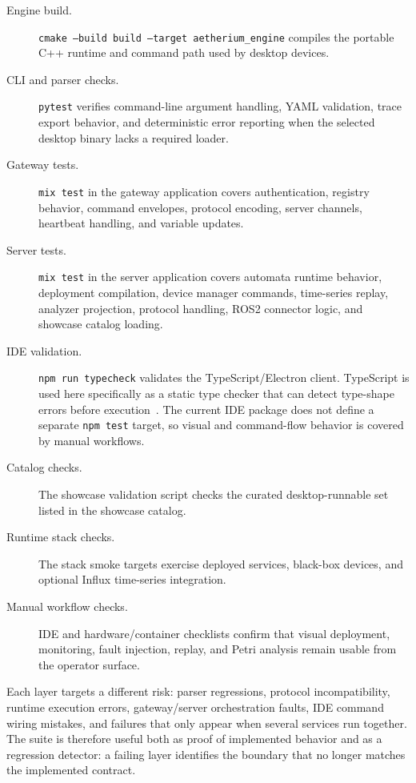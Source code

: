 \begin{description}
  \item[Engine build.] \texttt{cmake --build build --target aetherium\_engine} compiles the portable C++ runtime and command path used by desktop devices.
  \item[CLI and parser checks.] \texttt{pytest} verifies command-line argument handling, YAML validation, trace export behavior, and deterministic error reporting when the selected desktop binary lacks a required loader.
  \item[Gateway tests.] \texttt{mix test} in the gateway application covers authentication, registry behavior, command envelopes, protocol encoding, server channels, heartbeat handling, and variable updates.
  \item[Server tests.] \texttt{mix test} in the server application covers automata runtime behavior, deployment compilation, device manager commands, time-series replay, analyzer projection, protocol handling, ROS2 connector logic, and showcase catalog loading.
  \item[IDE validation.] \texttt{npm run typecheck} validates the TypeScript/Electron client. TypeScript is used here specifically as a static type checker that can detect type-shape errors before execution~\cite{TypeScriptHandbook}. The current IDE package does not define a separate \texttt{npm test} target, so visual and command-flow behavior is covered by manual workflows.
  \item[Catalog checks.] The showcase validation script checks the curated desktop-runnable set listed in the showcase catalog.
  \item[Runtime stack checks.] The stack smoke targets exercise deployed services, black-box devices, and optional Influx time-series integration.
  \item[Manual workflow checks.] IDE and hardware/container checklists confirm that visual deployment, monitoring, fault injection, replay, and Petri analysis remain usable from the operator surface.
\end{description}

Each layer targets a different risk: parser regressions, protocol incompatibility, runtime execution errors, gateway/server orchestration faults, IDE command wiring mistakes, and failures that only appear when several services run together. The suite is therefore useful both as proof of implemented behavior and as a regression detector: a failing layer identifies the boundary that no longer matches the implemented contract.

